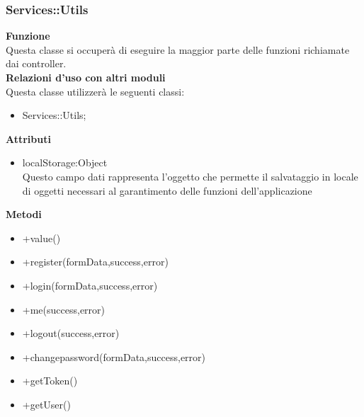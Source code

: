 \subsubsection{Services::Utils}
		\label{sub:servicesMain}
		\textbf{Funzione}\\
		\indent Questa classe si occuperà di eseguire la maggior parte delle funzioni richiamate dai controller.\\
		\textbf{Relazioni d'uso con altri moduli}\\
		\indent Questa classe utilizzerà le seguenti classi:
		\begin{itemize}
		\item Services::Utils;
		\end{itemize}
		\textbf{Attributi}\\
		\begin{itemize}
		\item localStorage:Object\\
		Questo campo dati rappresenta l’oggetto che permette il salvataggio in locale di oggetti necessari al garantimento delle funzioni dell'applicazione
		\end{itemize}
		\textbf{Metodi}
		\begin{itemize}
		\item +value()
		\item +register(formData,success,error)
		\item +login(formData,success,error)
		\item +me(success,error)
		\item +logout(success,error)
		\item +changepassword(formData,success,error)
		\item +getToken()
		\item +getUser()

		\end{itemize} 
